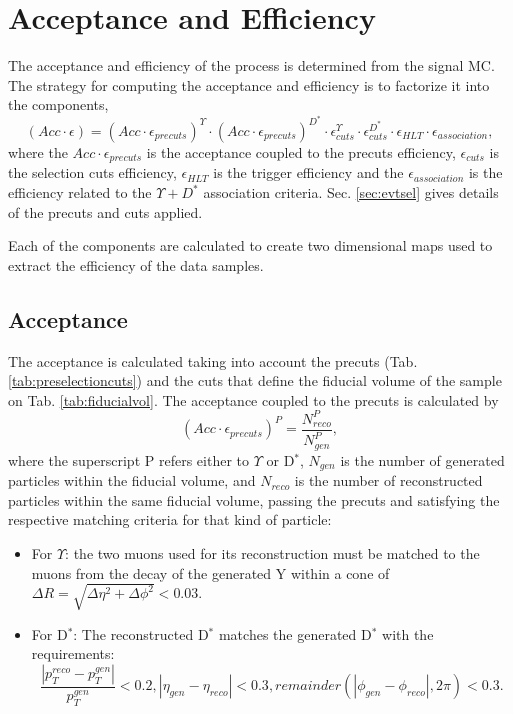 \section{Acceptance and Efficiency} \label{sec:efficiency}

The acceptance and efficiency of the process is determined from the signal MC. The strategy for computing the acceptance and efficiency is to factorize it into the components,
\begin{equation}
  (Acc\cdot\epsilon) = (Acc\cdot\epsilon_{precuts})^\Upsilon \cdot
  (Acc\cdot\epsilon_{precuts})^{D^*} \cdot \epsilon_{cuts}^\Upsilon \cdot
  \epsilon_{cuts}^{D^*} \cdot \epsilon_{HLT} \cdot \epsilon_{association},
\end{equation}
where the $Acc\cdot\epsilon_{precuts}$ is the acceptance coupled to the precuts efficiency, $\epsilon_{cuts}$ is the selection cuts efficiency, $\epsilon_{HLT}$ is the trigger efficiency and the $\epsilon_{association}$ is the efficiency related to the $\Upsilon+D^*$ association criteria. Sec. \ref{sec:evtsel} gives details of the precuts and cuts applied.

Each of the components are calculated to create two dimensional maps used to extract the efficiency of the data samples.

\subsection{Acceptance}

The acceptance is calculated taking into account the precuts (Tab. \ref{tab:preselectioncuts}) and the cuts that define the fiducial volume of the sample on Tab. \ref{tab:fiducialvol}. The acceptance coupled to the precuts is calculated by
\begin{equation}
  (Acc \cdot \epsilon_{precuts})^P = \frac{N_{reco}^P}{N_{gen}^P},
\end{equation}
where the superscript P refers either to $\Upsilon$ or D$^*$, $N_{gen}$ is the number of generated particles within the fiducial volume, and $N_{reco}$ is the number of reconstructed particles within the same fiducial volume, passing the precuts and satisfying the respective matching criteria for that kind of particle:
\begin{itemize}
  \item For $\Upsilon$: the two muons used for its reconstruction must be matched to the muons from the decay of the generated Y within a cone of $\Delta R = \sqrt{\Delta \eta^2 + \Delta \phi^2} < 0.03$.
  \item For D$^*$: The reconstructed D$^*$ matches the generated D$^*$ with the requirements:
        $$\frac{|p_T^{reco} - p_T^{gen}|}{p_T^{gen}} < 0.2, |\eta_{gen} - \eta_{reco}|
          < 0.3, remainder(|\phi_{gen} - \phi_{reco}|, 2\pi) < 0.3.$$
\end{itemize}

